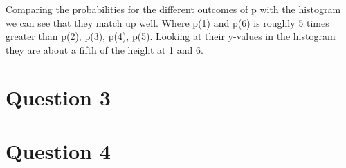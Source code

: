 \documentclass{article}
\begin{document}
Comparing the probabilities for the different outcomes of p with the histogram we can see that they match up well. Where p(1) and p(6) is roughly 5 times greater than p(2), p(3), p(4), p(5). Looking at their y-values in the histogram they are about a fifth of the height at 1 and 6.

\section{Question 3}
\section{Question 4}
\end{document}

